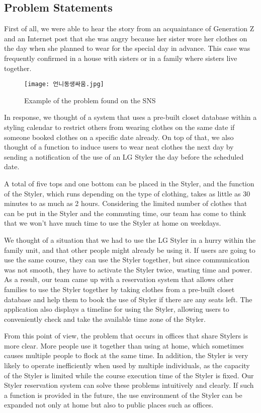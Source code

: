 \documentclass[conference]{IEEEtran}
\begin{document}
\subsection{Problem Statements}
First of all, we were able to hear the story from an acquaintance of Generation Z and an Internet post that she was angry because her sister wore her clothes on the day when she planned to wear for the special day in advance. This case was frequently confirmed in a house with sisters or in a family where sisters live together.

  \begin{figure}[htbp]
        \centerline{\texttt{[image: 언니동생싸움.jpg]}}
        \caption{Example of the problem found on the SNS}
        \label{fig}
    \end{figure}

\newpage
In response, we thought of a system that uses a pre-built closet database within a styling calendar to restrict others from wearing clothes on the same date if someone booked clothes on a specific date already. On top of that, we also thought of a function to induce users to wear neat clothes the next day by sending a notification of the use of an LG Styler the day before the scheduled date.

A total of five tops and one bottom can be placed in the Styler, and the function of the Styler, which runs depending on the type of clothing, takes as little as 30 minutes to as much as 2 hours. Considering the limited number of clothes that can be put in the Styler and the commuting time, our team has come to think that we won't have much time to use the Styler at home on weekdays.

We thought of a situation that we had to use the LG Styler in a hurry within the family unit, and that other people might already be using it. If users are going to use the same course, they can use the Styler together, but since communication was not smooth, they have to activate the Styler twice, wasting time and power. As a result, our team came up with a reservation system that allows other families to use the Styler together by taking clothes from a pre-built closet database and help them to book the use of Styler if there are any seats left. The application also displays a timeline for using the Styler, allowing users to conveniently check and take the available time zone of the Styler.

From this point of view, the problem that occurs in offices that share Stylers is more clear. More people use it together than using at home, which sometimes causes multiple people to flock at the same time. In addition, the Styler is very likely to operate inefficiently when used by multiple individuals, as the capacity of the Styler is limited while the course execution time of the Styler is fixed. Our Styler reservation system can solve these problems intuitively and clearly. If such a function is provided in the future, the use environment of the Styler can be expanded not only at home but also to public places such as offices.
\end{document}
